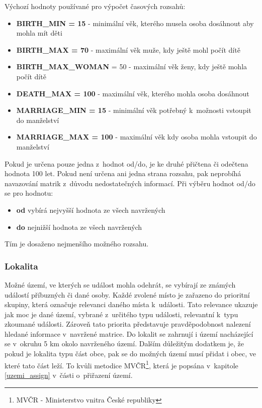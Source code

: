 Výchozí hodnoty používané pro výpočet časových rozsahů:
\begin{itemize}
	\item \textbf{BIRTH\_MIN = 15} - minimální věk, kterého musela osoba dosáhnout aby mohla mít děti
	\item \textbf{BIRTH\_MAX = 70} - maximální věk muže, kdy ještě mohl počít dítě
	\item \textbf{BIRTH\_MAX\_WOMAN} = 50  - maximální věk ženy, kdy ještě mohla počít dítě
	\item \textbf{DEATH\_MAX = 100} - maximální věk, kterého mohla osoba dosáhnout
	\item \textbf{MARRIAGE\_MIN = 15}  - minimální věk potřebný k~možnosti vstoupit do manželství
	\item \textbf{MARRIAGE\_MAX = 100} - maximální věk kdy osoba mohla vstoupit do manželství 
\end{itemize}

Pokud je určena pouze jedna z~hodnot od/do, je ke druhé přičtena či odečtena hodnota 100 let. Pokud není určena ani jedna strana rozsahu, pak neprobíhá navazování matrik z~důvodu nedostatečných informací. Při výběru hodnot od/do se pro hodnotu:

\begin{itemize}
	\item \textbf{od} vybírá nejvyšší hodnota ze všech navržených
	\item \textbf{do} nejnižší hodnota ze všech navržených
\end{itemize}

Tím je dosaženo nejmenšího možného rozsahu.

\subsubsection{Lokalita}
Možné území, ve kterých se událost mohla odehrát, se vybírají ze známých událostí příbuzných či dané osoby. Každé zvolené místo je zařazeno do prioritní skupiny, která označuje relevanci daného místa k~události. Tato relevance ukazuje jak moc je dané území, vybrané z~určitého typu události, relevantní k~typu zkoumané události. Zároveň tato priorita představuje pravděpodobnost nalezení hledané informace v~navržené matrice. Do lokalit se zahrnují i území nacházející se v~okruhu 5 km okolo navrženého území. Dalším důležitým dodatkem je, že pokud je lokalita typu část obce, pak se do možných území musí přidat i obec, ve které tato část leží. To kvůli metodice MVČR\footnote{MVČR - Ministerstvo vnitra České republiky}, která je popsána v~kapitole \ref{uzemi_assign} v~části o~přiřazení území.

